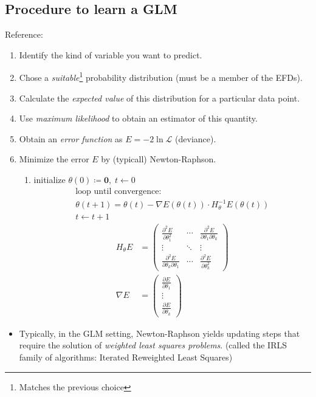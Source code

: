 \subsection{Procedure to learn a GLM}

Reference: 

\newcommand{\dcheckmark}{\checkmark~\hspace{-0.9em}\checkmark}

\begin{enumerate}
  \item Identify the kind of variable you want to predict. \checkmark
  \item Chose a \emph{suitable}\footnote{Matches the previous choice} probability distribution (must be a member of the EFDs). \dcheckmark
  \item Calculate the \emph{expected value} of this distribution for a particular
    data point. \dcheckmark
  \item Use \emph{maximum likelihood} to obtain an estimator of this quantity.
  \item Obtain an \emph{error function} as $E = -2\ln \mathcal{L}$ (deviance).
  \item Minimize the error $E$ by (typicall) Newton-Raphson.
    \begin{enumerate}
      \item initialize $\theta (0) \coloneqq \boldsymbol 0, \; t \gets 0$
        \begin{align*}
          \text{loop until convergence:} \\
          \theta (t+1) = \theta(t) - \nabla E(\theta(t)) \cdot H_\theta^{-1} E(\theta(t)) \\
          t \gets t + 1
        \end{align*}
        \begin{align*}
          H_\theta E &= \begin{pmatrix}
            \frac{\partial^2 E}{\partial \theta_1^2} & \cdots & \frac{\partial^2 E}{\partial \theta_1 \partial \theta_k} \\
            \vdots & \ddots & \vdots \\
            \frac{\partial^2 E}{\partial \theta_k \partial \theta_1} & \cdots & \frac{\partial^2 E}{\partial \theta_k^2}
          \end{pmatrix} \\
          \nabla E &= \begin{pmatrix}
            \frac{\partial E}{\partial \theta_1} \\
            \vdots \\
            \frac{\partial E}{\partial \theta_k}
          \end{pmatrix}
        \end{align*}
    \end{enumerate}
\end{enumerate}

\begin{itemize}
  \item Typically, in the GLM setting, Newton-Raphson yields updating
    steps that require the solution of \emph{weighted least squares problems}.
    (called the IRLS family of algorithms: Iterated Reweighted Least Squares)
\end{itemize}
